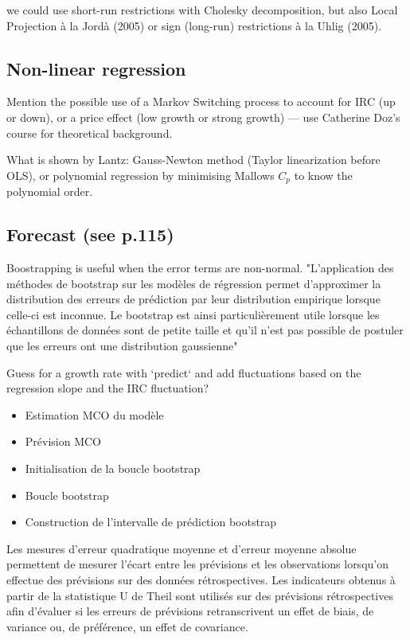 we could use short-run restrictions with Cholesky decomposition, but also Local Projection à la Jordà (2005) or sign (long-run) restrictions à la Uhlig (2005).

\subsection{Non-linear regression}
Mention the possible use of a Markov Switching process to account for IRC (up or down), or a price effect (low growth or strong growth) — use Catherine Doz's course for theoretical background.

What is shown by Lantz: Gauss-Newton method (Taylor linearization before OLS), or polynomial regression by minimising Mallows $C_p$ to know the polynomial order. 

\subsection{Forecast (see p.115)}
Boostrapping is useful when the error terms are non-normal. "L’application des méthodes de bootstrap sur les modèles de régression permet d’approximer la distribution des erreurs de prédiction par leur distribution empirique lorsque celle-ci est inconnue. Le bootstrap est ainsi particulièrement utile lorsque les
échantillons de données sont de petite taille et qu’il n’est pas possible de postuler que les erreurs ont une distribution gaussienne"

Guess for a growth rate with `predict` and add fluctuations based on the regression slope and the IRC fluctuation? \\

\begin{itemize}
    \item Estimation MCO du modèle
    \item Prévision MCO
    \item Initialisation de la boucle bootstrap
    \item Boucle bootstrap
    \item Construction de l’intervalle de prédiction bootstrap
\end{itemize}

Les mesures d’erreur quadratique moyenne et d’erreur moyenne absolue permettent de mesurer l’écart entre les prévisions et les observations lorsqu’on effectue
des prévisions sur des données rétrospectives. Les indicateurs obtenus à partir de la statistique U de Theil sont utilisés sur des prévisions rétrospectives afin d’évaluer si les erreurs de prévisions retranscrivent un effet de biais, de variance ou, de préférence, un
effet de covariance.